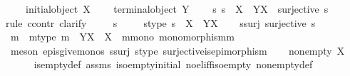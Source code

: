 \begin{isabellebody}
\ \ \ {\isachardoublequoteopen}{\isasymnot}\ initial{\isacharunderscore}{\kern0pt}object\ X{\isachardoublequoteclose}\isanewline
\ \ \ {\isachardoublequoteopen}{\isasymnot}\ terminal{\isacharunderscore}{\kern0pt}object\ Y{\isachardoublequoteclose}\isanewline
\ \ \ {\isachardoublequoteopen}{\isasymnexists}\ s{\isachardot}{\kern0pt}\ s\ {\isacharcolon}{\kern0pt}\ X\ {\isasymrightarrow}\ Y\isactrlbsup X\isactrlesup \ {\isasymand}\ surjective\ s{\isachardoublequoteclose}\isanewline
%
\isadelimproof
%
\endisadelimproof
%
\isatagproof
{}\isamarkupfalse%
{\isacharparenleft}{\kern0pt}rule\ ccontr{\isacharcomma}{\kern0pt}\ clarify{\isacharparenright}{\kern0pt}\ \isanewline
\ \ \isamarkupfalse%
\ s\ \isanewline
\ \ \isamarkupfalse%
\ s{\isacharunderscore}{\kern0pt}type{\isacharcolon}{\kern0pt}\ {\isachardoublequoteopen}s\ {\isacharcolon}{\kern0pt}\ X\ {\isasymrightarrow}\ Y\isactrlbsup X\isactrlesup {\isachardoublequoteclose}\isanewline
\ \ \isamarkupfalse%
\ s{\isacharunderscore}{\kern0pt}surj{\isacharcolon}{\kern0pt}\ {\isachardoublequoteopen}surjective\ s{\isachardoublequoteclose}\isanewline
\ \ \isamarkupfalse%
\ m\ \ m{\isacharunderscore}{\kern0pt}type{\isacharcolon}{\kern0pt}\ {\isachardoublequoteopen}m\ {\isacharcolon}{\kern0pt}\ Y\isactrlbsup X\isactrlesup \ {\isasymrightarrow}\ X{\isachardoublequoteclose}\ \ m{\isacharunderscore}{\kern0pt}mono{\isacharcolon}{\kern0pt}\ {\isachardoublequoteopen}monomorphism{\isacharparenleft}{\kern0pt}m{\isacharparenright}{\kern0pt}{\isachardoublequoteclose}\isanewline
\ \ \ \ \isamarkupfalse%
\ {\isacharparenleft}{\kern0pt}meson\ epis{\isacharunderscore}{\kern0pt}give{\isacharunderscore}{\kern0pt}monos\ s{\isacharunderscore}{\kern0pt}surj\ s{\isacharunderscore}{\kern0pt}type\ surjective{\isacharunderscore}{\kern0pt}is{\isacharunderscore}{\kern0pt}epimorphism{\isacharparenright}{\kern0pt}\isanewline
\ \ \isamarkupfalse%
\ {\isachardoublequoteopen}nonempty\ X{\isachardoublequoteclose}\isanewline
\ \ \ \ \isamarkupfalse%
\ is{\isacharunderscore}{\kern0pt}empty{\isacharunderscore}{\kern0pt}def\ assms{\isacharparenleft}{\kern0pt}{}{\isacharparenright}{\kern0pt}\ iso{\isacharunderscore}{\kern0pt}empty{\isacharunderscore}{\kern0pt}initial\ no{\isacharunderscore}{\kern0pt}el{\isacharunderscore}{\kern0pt}iff{\isacharunderscore}{\kern0pt}iso{\isacharunderscore}{\kern0pt}empty\ nonempty{\isacharunderscore}{\kern0pt}def\ \isamarkupfalse%

\end{isabellebody}
